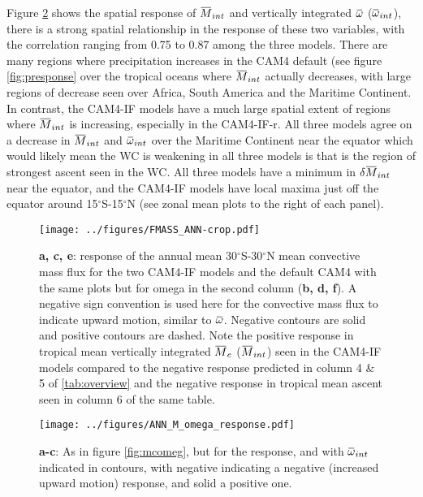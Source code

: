 \documentclass[letterpaper,12pt,titlepage,oneside,final]{book}
\newcommand{\overbar}[1]{\mkern 1.5mu\overline{\mkern-1.5mu#1\mkern-1.5mu}\mkern 1.5mu}
\begin{document}
Figure \ref{fig:mcomegres} shows the spatial response of $\overbar{M}_{int}$ and vertically integrated $\overbar{\omega}$ ($\overbar{\omega}_{int}$), there is a strong spatial relationship in the response of these two variables, with the correlation ranging from 0.75 to 0.87 among the three models. There are many regions where precipitation increases in the CAM4 default (see figure \ref{fig:presponse} over the tropical oceans where $\overbar{M}_{int}$ actually decreases, with large regions of decrease seen over Africa, South America and the Maritime Continent. In contrast, the CAM4-IF models have a much large spatial extent of regions where $\overbar{M}_{int}$ is increasing, especially in the CAM4-IF-r. All three models agree on a decrease in $\overbar{M}_{int}$ and $\overbar{\omega}_{int}$ over the Maritime Continent near the equator which would likely mean the WC is weakening in all three models is that is the region of strongest ascent seen in the WC. All three models have a minimum in $\delta\overbar{M}_{int}$ near the equator, and the CAM4-IF models have local maxima just off the equator around 15$^{\circ}$S-15$^{\circ}$N (see zonal mean plots to the right of each panel).

\begin{figure}[H]
\centering
\noindent\texttt{[image: ../figures/FMASS\_ANN-crop.pdf]}\hfill
\caption{\footnotesize \footnotesize\textbf{a, c, e}: response of the annual mean 30$^\circ$S-30$^\circ$N mean convective mass flux for the two CAM4-IF models and the default CAM4 with the same plots but for omega in the second column (\textbf{b, d, f}). A negative sign convention is used here for the convective mass flux to indicate upward motion, similar to $\overbar{\omega}$. Negative contours are solid and positive contours are dashed. Note the positive response in tropical mean vertically integrated $\overbar{M}_{c}$ ($\overbar{M}_{int}$) seen in the CAM4-IF models compared to the negative response predicted in column 4 \& 5 of \ref{tab:overview} and the negative response in tropical mean ascent seen in column 6 of the same table. }
\label{fig:Mc}
\end{figure}

\begin{figure}[H]
\centering
\noindent\texttt{[image: ../figures/ANN\_M\_omega\_response.pdf]}\hfill
\caption{\footnotesize \textbf{a-c}: As in figure \ref{fig:mcomeg}, but for the response, and with $\overbar{\omega}_{int}$ indicated in contours, with negative indicating a negative (increased upward motion) response, and solid a positive one.}
\label{fig:mcomegres}
\end{figure}
\end{document}
